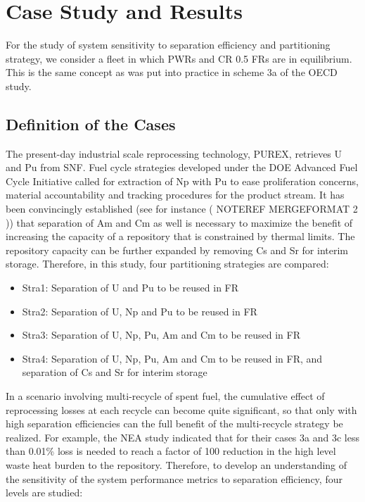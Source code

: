\section{Case Study and Results}
\label{ses_sec:case_study}
For the study of system sensitivity to separation efficiency and
partitioning strategy, we consider a fleet in which PWRs and CR 0.5 FRs
are in equilibrium.  This is the same concept as was put into practice
in scheme 3a of the OECD study.


\subsection{Definition of the Cases}
\label{ses_sec:case_def}
The present-day industrial scale reprocessing technology, PUREX,
retrieves U and Pu from SNF. Fuel cycle strategies developed under the
DOE Advanced Fuel Cycle Initiative called for extraction of Np with Pu
to ease proliferation concerns, material accountability and tracking
procedures for the product stream. It has been convincingly established
(see for instance (  NOTEREF 
MERGEFORMAT  2 )) that separation of Am and Cm as well is necessary to
maximize the benefit of increasing the capacity of a repository that is
constrained by thermal limits.  The repository capacity can be further
expanded by removing Cs and Sr for interim storage. Therefore, in this
study, four partitioning strategies are compared:

\begin{itemize}
    \item Stra1: Separation of U and Pu to be reused in FR
    \item Stra2: Separation of U, Np and Pu to be reused in FR
    \item Stra3: Separation of U, Np, Pu, Am and Cm to be reused in FR
    \item Stra4: Separation of U, Np, Pu, Am and Cm to be reused in FR, and
          separation of Cs and Sr for interim storage
\end{itemize}

In a scenario involving multi-recycle of spent fuel, the cumulative
effect of reprocessing losses at each recycle can become quite
significant, so that only with high separation efficiencies can the full
benefit of the multi-recycle strategy be realized.  For example, the NEA
study indicated that for their cases 3a and 3c less than 0.01\% loss is
needed to reach a factor of 100 reduction in the high level waste heat
burden to the repository.  Therefore, to develop an understanding of the
sensitivity of the system performance metrics to separation efficiency,
four levels are studied:

